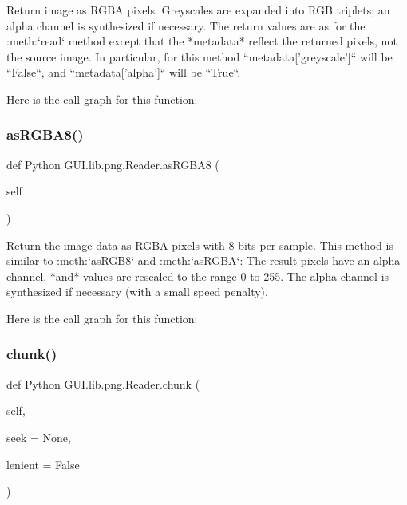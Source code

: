 \begin{DoxyVerb}Return image as RGBA pixels.  Greyscales are expanded into
RGB triplets; an alpha channel is synthesized if necessary.
The return values are as for the :meth:`read` method
except that the *metadata* reflect the returned pixels, not the
source image.  In particular, for this method
``metadata['greyscale']`` will be ``False``, and
``metadata['alpha']`` will be ``True``.
\end{DoxyVerb}
 Here is the call graph for this function\+:
\mbox{\label{class_python_01_g_u_i_1_1lib_1_1png_1_1_reader_ae97eb1af3aaa07e44533d940d99f5711}} 
\subsubsection{\texorpdfstring{as\+R\+G\+B\+A8()}{asRGBA8()}}
{\footnotesize\ttfamily def Python G\+U\+I.\+lib.\+png.\+Reader.\+as\+R\+G\+B\+A8 (\begin{DoxyParamCaption}\item[{}]{self }\end{DoxyParamCaption})}

\begin{DoxyVerb}Return the image data as RGBA pixels with 8-bits per
sample.  This method is similar to :meth:`asRGB8` and
:meth:`asRGBA`:  The result pixels have an alpha channel, *and*
values are rescaled to the range 0 to 255.  The alpha channel is
synthesized if necessary (with a small speed penalty).
\end{DoxyVerb}
 Here is the call graph for this function\+:
\mbox{\label{class_python_01_g_u_i_1_1lib_1_1png_1_1_reader_afdde66c74c4a588f77ce5a5a51e19d20}} 
\subsubsection{\texorpdfstring{chunk()}{chunk()}}
{\footnotesize\ttfamily def Python G\+U\+I.\+lib.\+png.\+Reader.\+chunk (\begin{DoxyParamCaption}\item[{}]{self,  }\item[{}]{seek = {\ttfamily None},  }\item[{}]{lenient = {\ttfamily False} }\end{DoxyParamCaption})}

